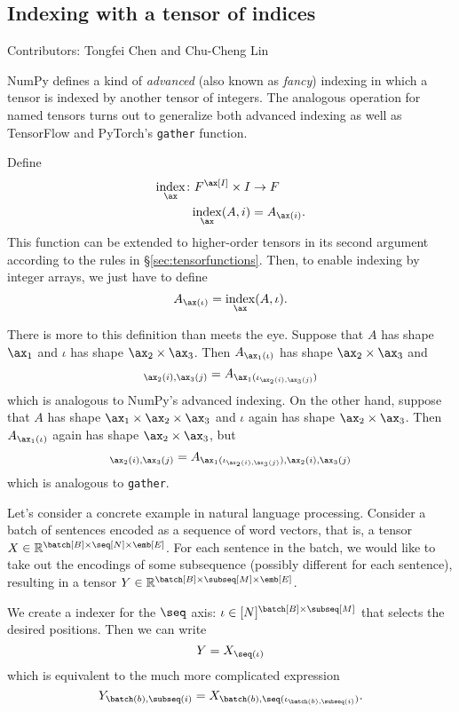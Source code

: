 \subsection{Indexing with a tensor of indices}

Contributors: Tongfei Chen and Chu-Cheng Lin

NumPy defines a kind of \emph{advanced} (also known as \emph{fancy}) indexing in which a tensor is indexed by another tensor of integers. The analogous operation for named tensors turns out to generalize both advanced indexing as well as TensorFlow and PyTorch's \verb|gather| function.

Define
\begin{align*}
  \nfun{\ax}{index} \colon F^{\ax[I]} \times I &\rightarrow F \\
  \nfun{\ax}{index}(A, i) &= A_{\ax(i)}.
\end{align*}
This function can be extended to higher-order tensors in its second argument according to the rules in \S\ref{sec:tensorfunctions}. Then, to enable indexing by integer arrays, we just have to define
\begin{equation*}
  A_{\ax(\iota)} = \nfun{\ax}{index}(A, \iota).
\end{equation*}

There is more to this definition than meets the eye. Suppose that $A$ has shape $\ax_1$ and $\iota$ has shape $\ax_2 \times \ax_3$. Then $A_{\ax_1(\iota)}$ has shape $\ax_2 \times \ax_3$ and
\begin{equation*}
  [A_{\ax_1(\iota)}]_{\ax_2(i),\ax_3(j)} = A_{\ax_1(\iota_{\ax_2(i),\ax_3(j)})}
\end{equation*}
which is analogous to NumPy's advanced indexing. On the other hand, suppose that $A$ has shape $\ax_1 \times \ax_2 \times \ax_3$ and $\iota$ again has shape $\ax_2 \times \ax_3$. Then $A_{\ax_1(\iota)}$ again has shape $\ax_2 \times \ax_3$, but
\begin{equation*}
  [A_{\ax_1(\iota)}]_{\ax_2(i),\ax_3(j)} = A_{\ax_1(\iota_{\ax_2(i),\ax_3(j)}),\ax_2(i),\ax_3(j)}
\end{equation*}
which is analogous to \verb|gather|.


Let's consider a concrete example in natural language processing. Consider a batch of sentences encoded as a sequence of word vectors, that is, a tensor $X \in \mathbb{R}^{\batch[B] \times \seq[N] \times \emb[E]}$. For each sentence in the batch, we would like to take out the encodings of some subsequence (possibly different for each sentence), resulting in a tensor $Y \in \mathbb{R}^{\batch[B] \times \subseq[M] \times \emb[E]}$.

We create a indexer for the $\seq$ axis: $\iota \in [N]^{\batch[B] \times \subseq[M]}$ that selects the desired positions. Then we can write
\begin{equation*}
  Y = X_{\seq(\iota)}
\end{equation*}
which is equivalent to the much more complicated expression
\begin{equation*}
  Y_{\batch(b),\subseq(i)} = X_{\batch(b),\seq(\iota_{\batch(b),\subseq(i)})}.
\end{equation*}
